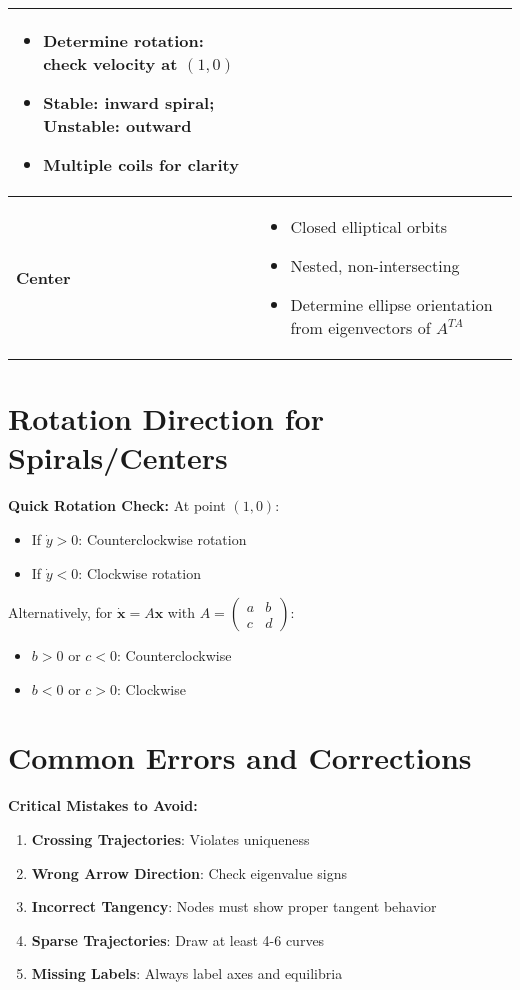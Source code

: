 \documentclass[12pt]{article}
\begin{document}
\begin{center}
\begin{tabular}{|l|p{8cm}|}
\begin{itemize}
    \item Determine rotation: check velocity at $(1,0)$
    \item Stable: inward spiral; Unstable: outward
    \item Multiple coils for clarity
\end{itemize} \\
\hline
\textbf{Center} &
\begin{itemize}
    \item Closed elliptical orbits
    \item Nested, non-intersecting
    \item Determine ellipse orientation from eigenvectors of $A^{TA}$
\end{itemize} \\
\hline
\end{tabular}
\end{center}

\section{Rotation Direction for Spirals/Centers}

\begin{keypoint}
\textbf{Quick Rotation Check:}
At point $(1, 0)$:
\begin{itemize}
    \item If $\dot{y} > 0$: Counterclockwise rotation
    \item If $\dot{y} < 0$: Clockwise rotation
\end{itemize}
Alternatively, for $\dot{\mathbf{x}} = A\mathbf{x}$ with $A = \begin{pmatrix} a & b \\ c & d \end{pmatrix}$:
\begin{itemize}
    \item $b > 0$ or $c < 0$: Counterclockwise
    \item $b < 0$ or $c > 0$: Clockwise
\end{itemize}
\end{keypoint}

\section{Common Errors and Corrections}

\begin{warning}
\textbf{Critical Mistakes to Avoid:}
\begin{enumerate}
    \item \textbf{Crossing Trajectories}: Violates uniqueness
    \item \textbf{Wrong Arrow Direction}: Check eigenvalue signs
    \item \textbf{Incorrect Tangency}: Nodes must show proper tangent behavior
    \item \textbf{Sparse Trajectories}: Draw at least 4-6 curves
    \item \textbf{Missing Labels}: Always label axes and equilibria
\end{enumerate}
\end{warning}
\end{document}
